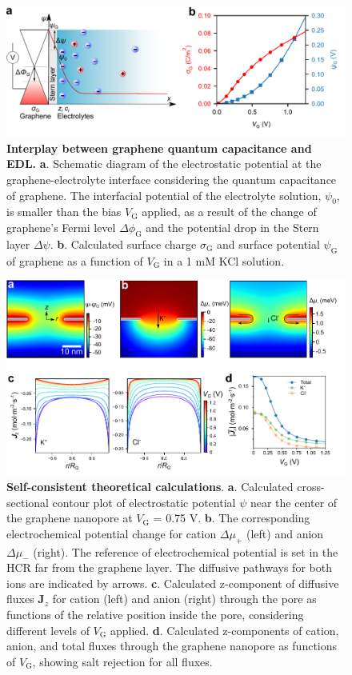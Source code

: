 \documentclass[journal=langd5,email=true, hyperref=true, keywords=false]{achemso}
\begin{document}
\begin{figure}[htbp]
  \centering
  \includegraphics[width=0.95\linewidth]{img/fig3.pdf}
  \caption{\textbf{Interplay between graphene quantum capacitance and
      EDL.} \textbf{a}. Schematic diagram of the electrostatic
    potential at the graphene-electrolyte interface considering the
    quantum capacitance of graphene. The interfacial potential of the
    electrolyte solution, $\psi_{0}$, is smaller than the bias
    $V_{\mathrm{G}}$ applied, as a result of the change of graphene’s
    Fermi level $\Delta \phi_{\mathrm{G}}$ and the potential drop in
    the Stern layer $\Delta \psi$. \textbf{b}. Calculated surface
    charge $\sigma_{\mathrm{G}}$ and surface potential
    $\psi_{\mathrm{G}}$ of graphene as a function of $V_{\mathrm{G}}$
    in a 1 mM KCl solution. }
  \label{fig:3}
\end{figure}

\begin{figure}[htbp]
  \centering
  \includegraphics[width=0.95\linewidth]{img/fig4.pdf}
  \caption{\textbf{Self-consistent theoretical
      calculations}. \textbf{a}. Calculated cross-sectional contour
    plot of electrostatic potential $\psi$ near the center of the
    graphene nanopore at $V_{\mathrm{G}}$ = 0.75 V. \textbf{b}. The
    corresponding electrochemical potential change for cation
    $\Delta \mu_{+}$ (left) and anion $\Delta \mu_{-}$ (right). The
    reference of electrochemical potential is set in the HCR far from
    the graphene layer. The diffusive pathways for both ions are
    indicated by arrows. \textbf{c}. Calculated z-component of
    diffusive fluxes $\boldsymbol{J}_{z}$ for cation (left) and anion
    (right) through the pore as functions of the relative position
    inside the pore, considering different levels of $V_{\mathrm{G}}$
    applied. \textbf{d}. Calculated z-components of cation, anion, and
    total fluxes through the graphene nanopore as functions of
    $V_{\mathrm{G}}$, showing salt rejection for all fluxes.}
  \label{fig:4}
\end{figure}
\end{document}
